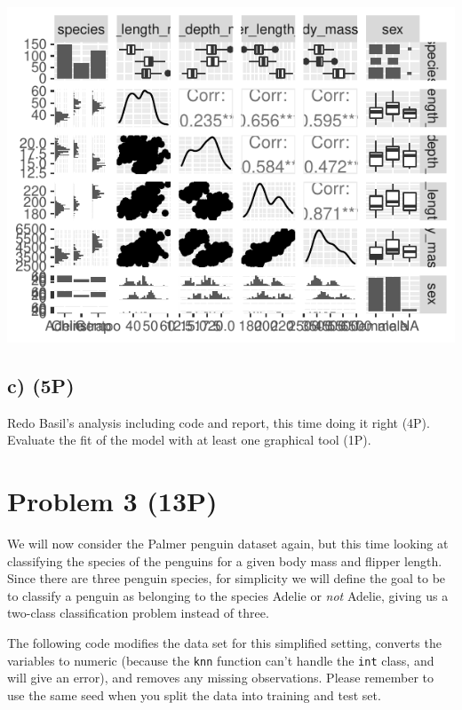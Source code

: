 \documentclass[
]{article}
\begin{document}
\begin{center}\includegraphics{Compulsory1_files/figure-latex/unnamed-chunk-3-1} \end{center}

\hypertarget{c-5p}{%
\subsection{c) (5P)}\label{c-5p}}

Redo Basil's analysis including code and report, this time doing it
right (4P). Evaluate the fit of the model with at least one graphical
tool (1P).

\hypertarget{problem-3-13p}{%
\section{Problem 3 (13P)}\label{problem-3-13p}}

We will now consider the Palmer penguin dataset again, but this time
looking at classifying the species of the penguins for a given body mass
and flipper length. Since there are three penguin species, for
simplicity we will define the goal to be to classify a penguin as
belonging to the species Adelie or \emph{not} Adelie, giving us a
two-class classification problem instead of three.

The following code modifies the data set for this simplified setting,
converts the variables to numeric (because the \texttt{knn} function
can't handle the \texttt{int} class, and will give an error), and
removes any missing observations. Please remember to use the same seed
when you split the data into training and test set.
\end{document}
